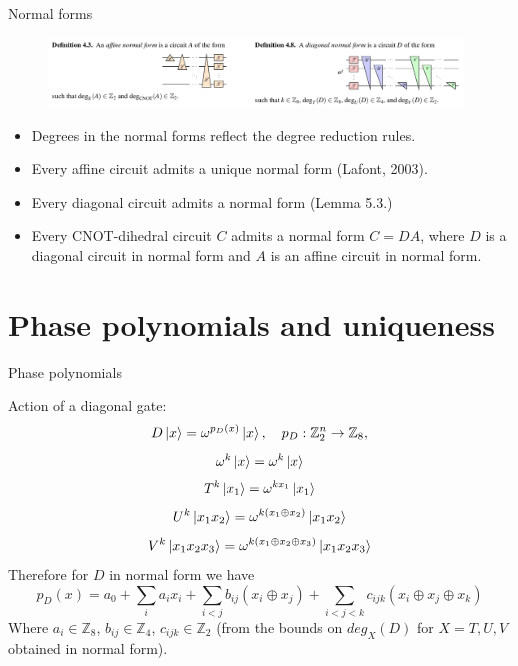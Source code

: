 \documentclass{beamer}
\theoremstyle{definition}
\begin{document}
\begin{frame}{Normal forms}

\begin{figure}
\includegraphics[width=11cm]{normal-forms}
\centering
\end{figure}
\begin{itemize}
\item Degrees in the normal forms reflect the degree reduction rules.
\item Every affine circuit admits a unique normal form (Lafont, 2003).
\item Every diagonal circuit admits a normal form (Lemma 5.3.)
\item Every CNOT-dihedral circuit $C$ admits a normal form $C=DA$, where $D$ is a diagonal circuit in normal form and $A$ is an affine circuit in normal form.
\end{itemize}
\end{frame}

\section{Phase polynomials and uniqueness}

\begin{frame}{Phase polynomials}

Action of a diagonal gate:
$$ D \ket{x} = \omega^{p_D(x)}\ket{x}, \quad p_D: \mathbb{Z}_2^n \rightarrow \mathbb{Z}_8 ,$$
$$ \omega^k \ket{x} = \omega^k \ket{x} $$
$$ T^k \ket{x_1} = \omega^{kx_1}\ket{x_1}$$
$$ U^k \ket{x_1x_2} = \omega^{k(x_1\oplus x_2)}\ket{x_1x_2}$$
$$ V^k \ket{x_1x_2x_3} = \omega^{k(x_1\oplus x_2 \oplus x_3)}\ket{x_1x_2x_3}$$
Therefore for $D$ in normal form we have
$$ p_D(x) = a_0 + \sum_i a_i x_i + \sum_{i<j}b_{ij} (x_i \oplus x_j) + \sum_{i<j<k}c_{ijk} (x_i \oplus x_j \oplus x_k)$$
Where $a_i \in \mathbb{Z}_8$, $b_{ij} \in \mathbb{Z}_4$, $c_{ijk} \in \mathbb{Z}_2$ (from the bounds on $deg_X(D)$ for $X=T,U,V$ obtained in normal form).

\end{frame}
\end{document}
